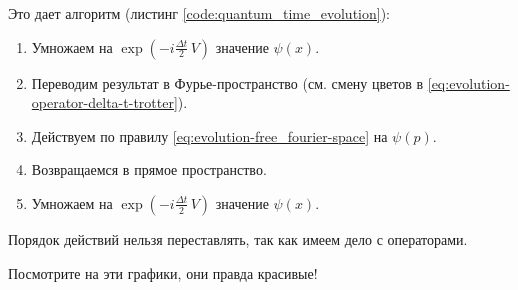 Это дает алгоритм (листинг \ref{code:quantum_time_evolution}):
\begin{enumerate}
    \item Умножаем на $\exp(-i \frac{\Delta t}{2}\,V)$ значение $\psi(x)$.
    \item Переводим результат в Фурье-пространство (см. смену цветов в \eqref{eq:evolution-operator-delta-t-trotter}).
    \item Действуем по правилу \eqref{eq:evolution-free_fourier-space} на $\psi(p)$.
    \item Возвращаемся в прямое пространство.
    \item Умножаем на $\exp(-i \frac{\Delta t}{2}\,V)$ значение $\psi(x)$.
\end{enumerate}
Порядок действий нельзя переставлять, так как имеем дело с операторами.


Посмотрите на эти графики, они правда красивые!
